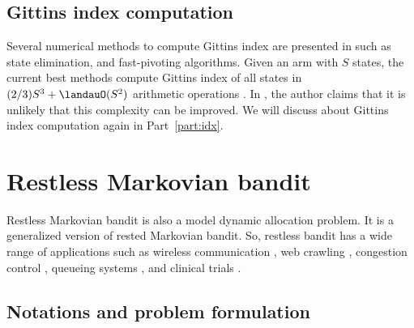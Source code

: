 
\subsection{Gittins index computation}

Several numerical methods to compute Gittins index are presented in \cite{chakravorty2014multi} such as state elimination, and fast-pivoting algorithms.
Given an arm with $S$ states, the current best methods compute Gittins index of all states in $(2/3)S^3+\landauO(S^2)$ arithmetic operations \cite{chakravorty2014multi}.
In \cite[Page~4]{nino2020fast}, the author claims that it is unlikely that this complexity can be improved.
We will discuss about Gittins index computation again in Part~\ref{part:idx}.

\section{Restless Markovian bandit}
\label{sec:restless_mab_pb}

Restless Markovian bandit is also a model dynamic allocation problem.
It is a generalized version of rested Markovian bandit.
So, restless bandit has a wide range of applications such as wireless communication \cite{aalto2019whittle, liu2010indexability}, web crawling \cite{avrachenkov2022whittle, nino2014dynamic}, congestion control \cite{avrachenkov2013congestion, avrachenkov2018impulsive}, queueing systems \cite{scully2018soap, aalto2011properties,aalto2009gittins,borkar2017whittle}, and clinical trials \cite{villar2015multi}.


\subsection{Notations and problem formulation}
\label{ssec:restless_formul}

